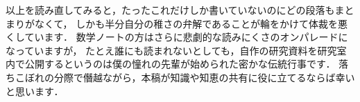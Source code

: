 以上を読み直してみると，たったこれだけしか書いていないのにどの段落もまとまりがなくて，
しかも半分自分の稚さの弁解であることが輪をかけて体裁を悪くしています．
数学ノートの方はさらに悲劇的な読みにくさのオンパレードになっていますが，
たとえ誰にも読まれないとしても，自作の研究資料を研究室内で公開するというのは僕の憧れの先輩が始められた密かな伝統行事です．
落ちこぼれの分際で僭越ながら，本稿が知識や知恵の共有に役に立てるならば幸いと思います．

